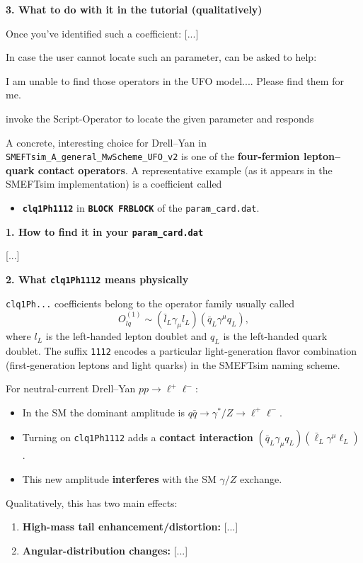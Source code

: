 \documentclass[submission, Phys]{SciPost}
\begin{document}
\begin{promptblock}[\ma (shortened)]
[...]

\textbf{3. What to do with it in the tutorial (qualitatively)}

Once you’ve identified such a coefficient: [...]
\end{promptblock}
%
In case the user cannot locate such an parameter, \ma can be asked to help:
%
\begin{userblock}[User]
I am unable to find those operators in the UFO model.... Please find them for me.
\end{userblock}
%
\ma invoke the Script-Operator to locate the given parameter and responds
%
\begin{promptblock}[\ma (shortened)]
A concrete, interesting choice for Drell--Yan in \lstinline|SMEFTsim_A_general_MwScheme_UFO_v2| is one of the \textbf{four-fermion lepton--quark contact operators}. A representative example (as it appears in the SMEFTsim implementation) is a coefficient called
\begin{itemize}
\item \textbf{\lstinline|clq1Ph1112|} in \textbf{\lstinline|BLOCK FRBLOCK|} of the \lstinline|param_card.dat|.
\end{itemize}

\textbf{1. How to find it in your \lstinline|param_card.dat|}

[...]

\textbf{2. What \lstinline|clq1Ph1112| means physically}

\lstinline|clq1Ph...| coefficients belong to the operator family usually called
\[
O_{lq}^{(1)} \sim (\bar l_L \gamma_\mu l_L)(\bar q_L \gamma^\mu q_L),
\]
where $l_L$ is the left-handed lepton doublet and $q_L$ is the left-handed quark doublet. The suffix \lstinline|1112| encodes a particular light-generation flavor combination (first-generation leptons and light quarks) in the SMEFTsim naming scheme.

For neutral-current Drell--Yan $pp \to \ell^+\ell^-$:
\begin{itemize}
\item In the SM the dominant amplitude is $q\bar q \to \gamma^*/Z \to \ell^+\ell^-.$
\item Turning on \lstinline|clq1Ph1112| adds a \textbf{contact interaction} $(\bar q_L \gamma_\mu q_L)(\bar \ell_L \gamma^\mu \ell_L)$.
\item This new amplitude \textbf{interferes} with the SM $\gamma/Z$ exchange.
\end{itemize}

Qualitatively, this has two main effects:
\begin{enumerate}
\item \textbf{High-mass tail enhancement/distortion:} [...]
\item \textbf{Angular-distribution changes:} [...]
\end{enumerate}

\end{promptblock}
\end{document}
